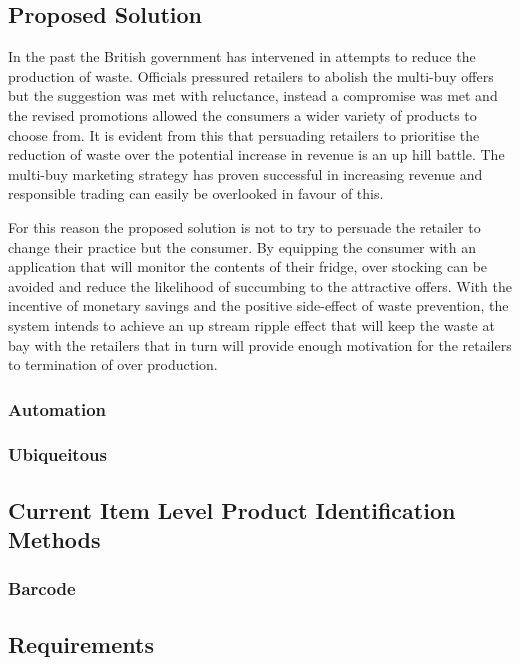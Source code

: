 \documentclass[a4paper, 11pt]{article}
\begin{document}
\subsection{Proposed Solution}

In the past the British government has intervened in attempts to reduce the production of waste. Officials pressured retailers to abolish the multi-buy offers but the suggestion was met with reluctance, instead a compromise was met and the revised promotions allowed the consumers a wider variety of products to choose from. It is evident from this that persuading retailers to prioritise the reduction of waste over the potential increase in revenue is an up hill battle. The multi-buy marketing strategy has proven successful in increasing revenue and responsible trading can easily be overlooked in favour of this.

For this reason the proposed solution is not to try to persuade the retailer to change their practice but the consumer. By equipping the consumer with an application that will monitor the contents of their fridge, over stocking can be avoided and reduce the likelihood of succumbing to the attractive offers. With the incentive of monetary savings and the positive side-effect of waste prevention, the system intends to achieve an up stream ripple effect that will keep the waste at bay with the retailers that in turn will provide enough motivation for the retailers to termination of over production. 


\subsubsection{Automation}


\subsubsection{Ubiqueitous}

\subsection{Current Item Level Product Identification Methods}
\subsubsection{Barcode}

\subsection{Requirements}
\end{document}
